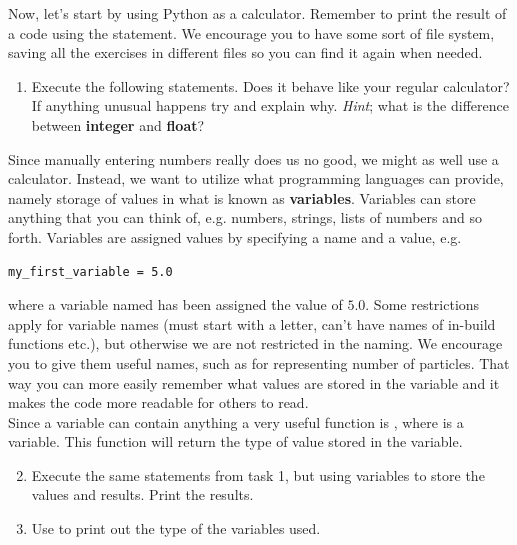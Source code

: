 \documentclass{article}
\begin{document}
Now, let's start by using Python as a calculator.
Remember to print the result of a code using the  statement.
We encourage you to have some sort of file system, saving all the exercises in
different files so you can find it again when needed.

\begin{enumerate}
  \item Execute the following statements. Does it behave like your regular
    calculator? If anything unusual happens try and explain why.
    {\em Hint}; what is the difference between {\bf integer} and {\bf float}?

    \begin{centering}
    \end{centering}
\end{enumerate}

Since manually entering numbers really does us no good, we might as well use a
calculator. Instead, we want to utilize what programming languages can provide,
namely storage of values in what is known as {\bf variables}. Variables can store
anything that you can think of, e.g. numbers, strings, lists of numbers and so
forth. Variables are assigned values by specifying a name and a value, e.g.

\begin{lstlisting}
my_first_variable = 5.0
\end{lstlisting}

where a variable named  has been assigned the value
of $5.0$.
Some restrictions apply for variable names (must start with a letter, can't have names of
in-build functions etc.), but otherwise we are not restricted in the naming. We encourage you to give
them useful names, such as  for representing number of
particles. That way you can more easily remember what values are stored in the variable
and it makes the code more readable for others to read.\\

Since a variable can contain anything a very useful function is ,
where  is a variable. This function will return the type of value stored
in the variable.

\begin{enumerate}
  \setcounter{enumi}{1}
  \item Execute the same statements from task 1, but using variables to store
    the values and results. Print the results.
  \item Use  to print out the type of the variables used.
\end{enumerate}
\end{document}
